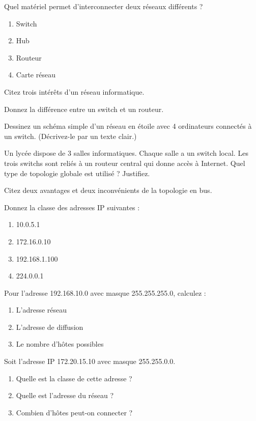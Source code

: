 \exo{}
Quel matériel permet d'interconnecter deux réseaux différents ?
\begin{enumerate}
    \item Switch
    \item Hub
    \item Routeur
    \item Carte réseau
\end{enumerate}


\exo{}
Citez trois intérêts d'un réseau informatique.

\exo{}
Donnez la différence entre un switch et un routeur.

\exo{}
Dessinez un schéma simple d'un réseau en étoile avec 4 ordinateurs connectés à un switch. (Décrivez-le par un texte clair.)

\exo{}
Un lycée dispose de 3 salles informatiques. Chaque salle a un switch local. Les trois switchs sont reliés à un routeur central qui donne accès à Internet. Quel type de topologie globale est utilisé ? Justifiez.

\exo{}
Citez deux avantages et deux inconvénients de la topologie en bus.


\exo{}
Donnez la classe des adresses IP suivantes :
\begin{enumerate}
    \item 10.0.5.1
    \item 172.16.0.10
    \item 192.168.1.100
    \item 224.0.0.1
\end{enumerate}

\exo{}
Pour l'adresse 192.168.10.0 avec masque 255.255.255.0, calculez :
\begin{enumerate}
    \item L'adresse réseau
    \item L'adresse de diffusion
    \item Le nombre d'hôtes possibles
\end{enumerate}

\exo{}
Soit l'adresse IP 172.20.15.10 avec masque 255.255.0.0.
\begin{enumerate}
    \item Quelle est la classe de cette adresse ?
    \item Quelle est l'adresse du réseau ?
    \item Combien d'hôtes peut-on connecter ?
\end{enumerate}


